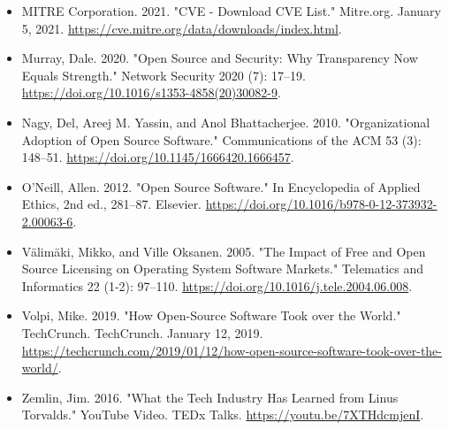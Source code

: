 \documentclass[10pt, a4paper, fleqn]{article}
\begin{document}
\begin{itemize}
	\item MITRE Corporation. 2021. "CVE - Download CVE List." Mitre.org. January 5, 2021. \url{https://cve.mitre.org/data/downloads/index.html}.
	\item Murray, Dale. 2020. "Open Source and Security: Why Transparency Now Equals Strength." Network Security 2020 (7): 17–19. \url{https://doi.org/10.1016/s1353-4858(20)30082-9}.
	\item Nagy, Del, Areej M. Yassin, and Anol Bhattacherjee. 2010. "Organizational Adoption of Open Source Software." Communications of the ACM 53 (3): 148–51. \url{https://doi.org/10.1145/1666420.1666457}.
	\item O’Neill, Allen. 2012. "Open Source Software." In Encyclopedia of Applied Ethics, 2nd ed., 281–87. Elsevier. \url{https://doi.org/10.1016/b978-0-12-373932-2.00063-6}.
	\item Välimäki, Mikko, and Ville Oksanen. 2005. "The Impact of Free and Open Source Licensing on Operating System Software Markets." Telematics and Informatics 22 (1-2): 97–110. \url{https://doi.org/10.1016/j.tele.2004.06.008}.
	\item Volpi, Mike. 2019. "How Open-Source Software Took over the World." TechCrunch. TechCrunch. January 12, 2019. \url{https://techcrunch.com/2019/01/12/how-open-source-software-took-over-the-world/}.
	\item Zemlin, Jim. 2016. "What the Tech Industry Has Learned from Linus Torvalds." YouTube Video. TEDx Talks. \url{https://youtu.be/7XTHdcmjenI}.
\end{itemize}
\end{document}
